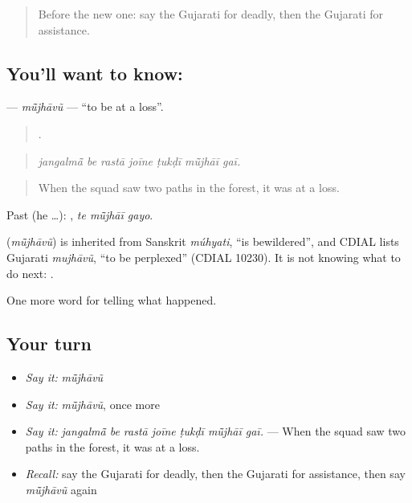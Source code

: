\label{lesson:GU-C310-mujhavu}



\begin{quote}
Before the new one: say the Gujarati for deadly, then the Gujarati for assistance.
\end{quote}

\subsection*{You'll want to know: }
\textbf{} — \emph{mū̃jhāvũ} — \textquotedblleft{}to be at a loss\textquotedblright{}.

\begin{quote}
      .
\end{quote}

\begin{quote}
\emph{jangalmā̃ be rastā joīne ṭukḍī mū̃jhāī gaī.}
\end{quote}

\begin{quote}
When the squad saw two paths in the forest, it was at a loss.
\end{quote}

Past (he …):   , \emph{te mū̃jhāī gayo}.

\begin{cousinweb}
\textbf{} (\emph{mū̃jhāvũ}) is inherited from Sanskrit \emph{múhyati}, \textquotedblleft{}is bewildered\textquotedblright{}, and CDIAL lists Gujarati \emph{mujhāvũ}, \textquotedblleft{}to be perplexed\textquotedblright{} (CDIAL 10230). It is not knowing what to do next: \textbf{ }.
\end{cousinweb}

\begin{grammarlens}[title={What you've built}]
One more word for telling what happened.
\end{grammarlens}

\subsection*{Your turn}
\begin{itemize}
\raggedright
  \item \emph{Say it:} \emph{mū̃jhāvũ}
  \item \emph{Say it:} \emph{mū̃jhāvũ}, once more
  \item \emph{Say it:} \emph{jangalmā̃ be rastā joīne ṭukḍī mū̃jhāī gaī.} — When the squad saw two paths in the forest, it was at a loss.
  \item \emph{Recall:} say the Gujarati for deadly, then the Gujarati for assistance, then say \emph{mū̃jhāvũ} again
\end{itemize}

